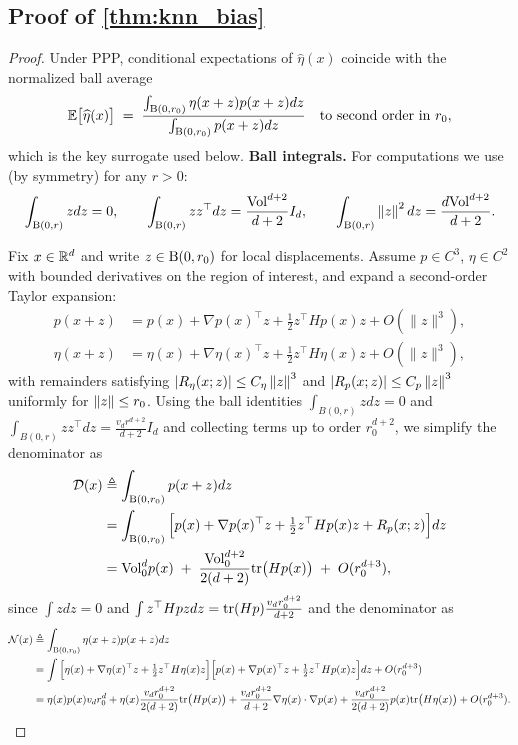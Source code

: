 \subsection{Proof of \cref{thm:knn_bias}}
\label{proof:knn_bias}
\begin{proof}

Under PPP, conditional expectations of $\widehat{\eta}(x)$ coincide with the normalized ball average
\[
\mathbb{E}\big[\widehat{\eta}(x)\big]
\;=\;
\frac{\int_{\mathrm{B}(0,r_0)} \eta(x+z)p(x+z)dz}{\int_{\mathrm{B}(0,r_0)} p(x+z)dz}
\quad\text{to second order in }r_0,
\]
which is the key surrogate used below.
\medskip
\noindent\textbf{Ball integrals.} For computations we use (by symmetry) for any $r>0$:
\[
\int_{\mathrm{B}(0,r)} zdz=0,\qquad
\int_{\mathrm{B}(0,r)} zz^\top dz=\frac{{\rm Vol}^{d+2}}{d+2}I_d,\qquad
\int_{\mathrm{B}(0,r)} \left\lVert z\right\rVert^2dz=\frac{d{\rm Vol}^{d+2}}{d+2}.
\]


Fix $x\in\mathbb{R}^d$ and write $z\in\mathrm{B}(0,r_0)$ for local displacements. 
Assume $p\in C^3$, $\eta\in C^2$ with bounded derivatives on the region of interest, and expand a second-order Taylor expansion:
\begin{align*}
p(x+z)&=p(x)+\nabla p(x)^\top z+\tfrac12 z^\top H p(x)z + O(\|z\|^3),\\
\eta(x+z)&=\eta(x)+\nabla\eta(x)^\top z+\tfrac12 z^\top H\eta(x)z + O(\|z\|^3),
\end{align*}
with remainders satisfying $|R_\eta(x;z)|\le C_\eta\left\lVert z\right\rVert^3$ and $|R_p(x;z)|\le C_p\left\lVert z\right\rVert^3$ uniformly for $\left\lVert z\right\rVert\le r_0$. Using the ball identities
$\int_{B(0,r)} zdz=0$ and $\int_{B(0,r)} zz^\top dz=\frac{v_d r^{d+2}}{d+2}I_d$ and collecting terms up to order $r_0^{d+2}$, we simplify the denominator as
\begin{align*}
    \mathcal{D}(x)&\triangleq\int_{\mathrm{B}(0,r_0)} p(x+z)dz\\
    &= \int_{\mathrm{B}(0,r_0)} \Big[p(x) + \nabla p(x)^\top z + \tfrac{1}{2}z^\top H p(x)z + R_p(x;z)\Big]dz\\
    &= {\rm Vol}_0^dp(x)\;+\;\frac{{\rm Vol}_0^{d+2}}{2(d+2)}\mathrm{tr}\big(H p(x)\big)\;+\;O(r_0^{d+3}),
\end{align*}
since $\int zdz=0$ and $\int z^\top H pzdz=\mathrm{tr}(H p)\frac{v_d r_0^{d+2}}{d+2}$ and the denominator as
\begin{align*}
\mathcal{N}(x)&\triangleq \int_{\mathrm{B}(0,r_0)} \eta(x+z)p(x+z)dz\\
    &= \int \Big[\eta(x)+\nabla\eta(x)^\top z+\tfrac{1}{2}z^\top H\eta(x)z\Big]
\Big[p(x)+\nabla p(x)^\top z+\tfrac{1}{2}z^\top H p(x)z\Big]dz+O(r_0^{d+3})\\
&= \eta(x)p(x)v_d r_0^d+\eta(x)\frac{v_d r_0^{d+2}}{2(d+2)}\mathrm{tr}\big(H p(x)\big)+\frac{v_d r_0^{d+2}}{d+2}\nabla\eta(x)\cdot\nabla p(x)+ \frac{v_d r_0^{d+2}}{2(d+2)}p(x)\mathrm{tr}\big(H\eta(x)\big)
+O(r_0^{d+3}).
\end{align*}



\end{proof}

